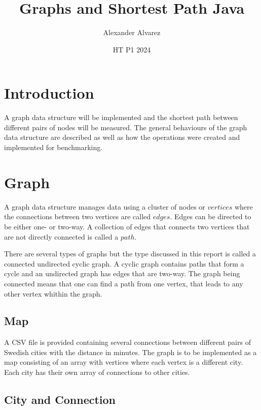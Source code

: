 \documentclass[a4paper,11pt]{article}
\begin{document}
\title{
  \textbf{Graphs and Shortest Path Java}
}
\author{Alexander Alvarez}
\date{HT P1 2024}

\maketitle

\section*{Introduction}

A graph data structure will be implemented and the shortest path 
between different pairs of nodes will be measured. The general 
behaviours of the graph data structure are described as well as how 
the operations were created and implemented for benchmarking.

\section*{Graph}

A graph data structure manages data using a cluster of nodes or 
$vertices$ where the connections between two vertices are called 
$edges$. Edges can be directed to be either one- or two-way. A 
collection of edges that connects two vertices that are not directly 
connected is called a $path$. 

There are several types of graphs but the type discussed in this report 
is called a connected undirected cyclic graph. A cyclic graph contains 
paths that form a cycle and an undirected graph has edges that are 
two-way. The graph being connected means that one can find a path 
from one vertex, that leads to any other vertex whithin the graph.

\subsection*{Map}

A CSV file is provided containing several connections between different 
pairs of Swedish cities with the distance in minutes. The graph is to be 
implemented as a map consisting of an array with vertices where each vertex 
is a different city. Each city has their own array of connections to other 
cities.

\subsection*{City and Connection}
\end{document}
